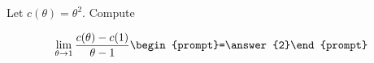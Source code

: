 \documentclass{ximera}
\author{Bart Snapp}
\begin{document}
\begin{exercise}
Let $c(\theta) = \theta ^2$. Compute

\[
\lim_{ \theta\to 1 } 
\frac{c(\theta)-c(1)}{\theta -1} \begin{prompt}=\answer{2}\end{prompt}
\]
\end{exercise}
\end{document}
